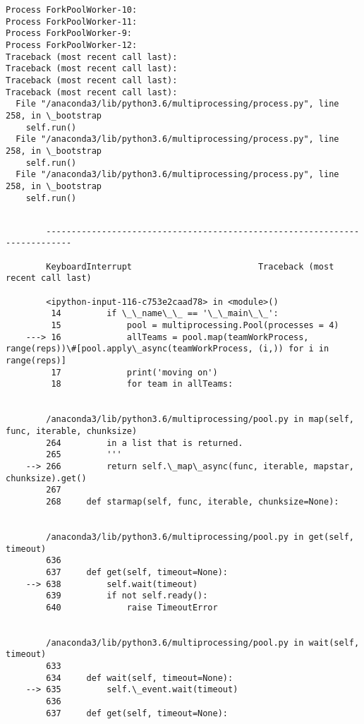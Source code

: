 \documentclass[11pt]{article}
\begin{document}
    \begin{Verbatim}[commandchars=\\\{\}]
Process ForkPoolWorker-10:
Process ForkPoolWorker-11:
Process ForkPoolWorker-9:
Process ForkPoolWorker-12:
Traceback (most recent call last):
Traceback (most recent call last):
Traceback (most recent call last):
Traceback (most recent call last):
  File "/anaconda3/lib/python3.6/multiprocessing/process.py", line 258, in \_bootstrap
    self.run()
  File "/anaconda3/lib/python3.6/multiprocessing/process.py", line 258, in \_bootstrap
    self.run()
  File "/anaconda3/lib/python3.6/multiprocessing/process.py", line 258, in \_bootstrap
    self.run()

    \end{Verbatim}

    \begin{Verbatim}[commandchars=\\\{\}]

        ---------------------------------------------------------------------------

        KeyboardInterrupt                         Traceback (most recent call last)

        <ipython-input-116-c753e2caad78> in <module>()
         14         if \_\_name\_\_ == '\_\_main\_\_':
         15             pool = multiprocessing.Pool(processes = 4)
    ---> 16             allTeams = pool.map(teamWorkProcess, range(reps))\#[pool.apply\_async(teamWorkProcess, (i,)) for i in range(reps)]
         17             print('moving on')
         18             for team in allTeams:


        /anaconda3/lib/python3.6/multiprocessing/pool.py in map(self, func, iterable, chunksize)
        264         in a list that is returned.
        265         '''
    --> 266         return self.\_map\_async(func, iterable, mapstar, chunksize).get()
        267 
        268     def starmap(self, func, iterable, chunksize=None):


        /anaconda3/lib/python3.6/multiprocessing/pool.py in get(self, timeout)
        636 
        637     def get(self, timeout=None):
    --> 638         self.wait(timeout)
        639         if not self.ready():
        640             raise TimeoutError


        /anaconda3/lib/python3.6/multiprocessing/pool.py in wait(self, timeout)
        633 
        634     def wait(self, timeout=None):
    --> 635         self.\_event.wait(timeout)
        636 
        637     def get(self, timeout=None):



\end{Verbatim}
\end{document}
